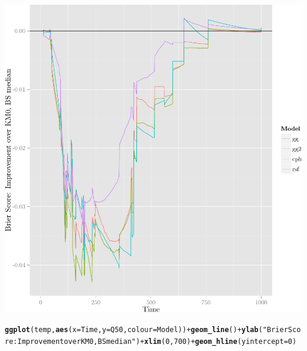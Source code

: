 \documentclass{article}\usepackage[]{graphicx}\usepackage[]{color}
\makeatletter
\def\maxwidth{ %
  \ifdim\Gin@nat@width>\linewidth
    \linewidth
  \else
    \Gin@nat@width
  \fi
}
\newcommand{\hlnum}[1]{\textcolor[rgb]{0.686,0.059,0.569}{#1}}%
\newcommand{\hlstr}[1]{\textcolor[rgb]{0.192,0.494,0.8}{#1}}%
\newcommand{\hlopt}[1]{\textcolor[rgb]{0,0,0}{#1}}%
\newcommand{\hlstd}[1]{\textcolor[rgb]{0.345,0.345,0.345}{#1}}%
\newcommand{\hlkwc}[1]{\textcolor[rgb]{0.333,0.667,0.333}{#1}}%
\newcommand{\hlkwd}[1]{\textcolor[rgb]{0.737,0.353,0.396}{\textbf{#1}}}%
\newenvironment{kframe}{%
 \def\at@end@of@kframe{}%
 \ifinner\ifhmode%
  \def\at@end@of@kframe{\end{minipage}}%
  \begin{minipage}{\columnwidth}%
 \fi\fi%
 \def\FrameCommand##1{\hskip\@totalleftmargin \hskip-\fboxsep
 \colorbox{shadecolor}{##1}\hskip-\fboxsep
     \hskip-\linewidth \hskip-\@totalleftmargin \hskip\columnwidth}%
 \MakeFramed {\advance\hsize-\width
   \@totalleftmargin\z@ \linewidth\hsize
   \@setminipage}}%
 {\par\unskip\endMakeFramed%
 \at@end@of@kframe}
\newenvironment{knitrout}{}{} %
\makeatother
\begin{document}
\begin{knitrout}
{\centering \includegraphics[width=\maxwidth]{figure/05-model-selection-bs-paths-5} 

}


\begin{kframe}\begin{alltt}
\hlkwd{ggplot}\hlstd{(temp,} \hlkwd{aes}\hlstd{(}\hlkwc{x} \hlstd{= Time,} \hlkwc{y} \hlstd{= Q50,} \hlkwc{colour} \hlstd{= Model))} \hlopt{+} \hlkwd{geom_line}\hlstd{()} \hlopt{+} \hlkwd{ylab}\hlstd{(}\hlstr{"Brier Score: Improvement over KM0, BS median"}\hlstd{)} \hlopt{+} \hlkwd{xlim}\hlstd{(}\hlnum{0}\hlstd{,} \hlnum{700}\hlstd{)} \hlopt{+} \hlkwd{geom_hline}\hlstd{(}\hlkwc{yintercept} \hlstd{=} \hlnum{0}\hlstd{)}
\end{alltt}


{\ttfamily\noindent\color{warningcolor}{\#\# Warning: Removed 1200 rows containing missing values (geom\_path).}}\end{kframe}


\end{knitrout}
\end{document}

